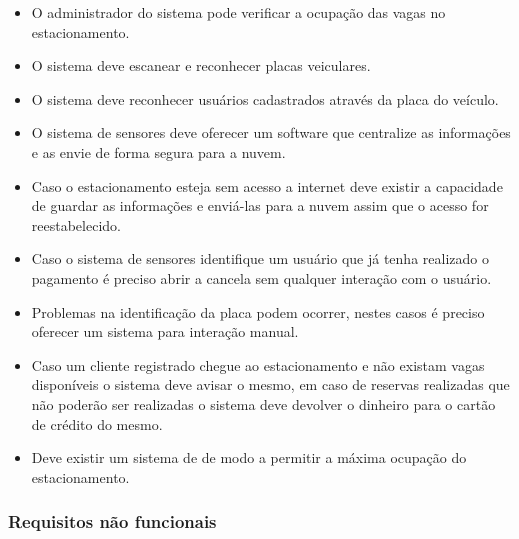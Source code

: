 \begin{itemize}
	\item O administrador do sistema pode verificar a ocupação das vagas no estacionamento.
	\item O sistema deve escanear e reconhecer placas veiculares.
	\item O sistema deve reconhecer usuários cadastrados através da placa do veículo.
	\item O sistema de sensores deve oferecer um software que centralize as informações e as envie de forma segura para a nuvem.
	\item Caso o estacionamento esteja sem acesso a internet deve existir a capacidade de guardar as informações e enviá-las para a nuvem assim que o acesso for reestabelecido.
	\item Caso o sistema de sensores identifique um usuário que já tenha realizado o pagamento é preciso abrir a cancela sem qualquer interação com o usuário.
	\item Problemas na identificação da placa podem ocorrer, nestes casos é preciso oferecer um sistema para interação manual.
	\item Caso um cliente registrado chegue ao estacionamento e não existam vagas disponíveis o sistema deve avisar o mesmo, em caso de reservas realizadas que não poderão ser realizadas o sistema deve devolver o dinheiro para o cartão de crédito do mesmo.
    \item Deve existir um sistema de  de modo a permitir a máxima ocupação do estacionamento.
\end{itemize}

\subsubsection{Requisitos não funcionais}





